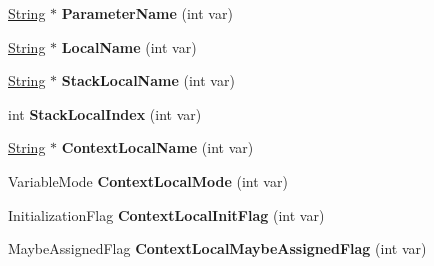 \begin{DoxyCompactItemize}
\item 
\hyperlink{classv8_1_1internal_1_1_string}{String} $\ast$ {\bfseries Parameter\+Name} (int var)\hypertarget{classv8_1_1internal_1_1_scope_info_add97fe28aedcb5de286d0d79fd291aef}{}\label{classv8_1_1internal_1_1_scope_info_add97fe28aedcb5de286d0d79fd291aef}

\item 
\hyperlink{classv8_1_1internal_1_1_string}{String} $\ast$ {\bfseries Local\+Name} (int var)\hypertarget{classv8_1_1internal_1_1_scope_info_acdac107aacd45fbfed0068240e5616bc}{}\label{classv8_1_1internal_1_1_scope_info_acdac107aacd45fbfed0068240e5616bc}

\item 
\hyperlink{classv8_1_1internal_1_1_string}{String} $\ast$ {\bfseries Stack\+Local\+Name} (int var)\hypertarget{classv8_1_1internal_1_1_scope_info_af01df9ddb90605479c6c065e8df37287}{}\label{classv8_1_1internal_1_1_scope_info_af01df9ddb90605479c6c065e8df37287}

\item 
int {\bfseries Stack\+Local\+Index} (int var)\hypertarget{classv8_1_1internal_1_1_scope_info_a88941dda595181e23537eea761b308cf}{}\label{classv8_1_1internal_1_1_scope_info_a88941dda595181e23537eea761b308cf}

\item 
\hyperlink{classv8_1_1internal_1_1_string}{String} $\ast$ {\bfseries Context\+Local\+Name} (int var)\hypertarget{classv8_1_1internal_1_1_scope_info_acca4416c621b0b833e57bca1d5dff907}{}\label{classv8_1_1internal_1_1_scope_info_acca4416c621b0b833e57bca1d5dff907}

\item 
Variable\+Mode {\bfseries Context\+Local\+Mode} (int var)\hypertarget{classv8_1_1internal_1_1_scope_info_a591902882e5e0a03a3e4a47361ffe32f}{}\label{classv8_1_1internal_1_1_scope_info_a591902882e5e0a03a3e4a47361ffe32f}

\item 
Initialization\+Flag {\bfseries Context\+Local\+Init\+Flag} (int var)\hypertarget{classv8_1_1internal_1_1_scope_info_a03953d8010b3cfa19b38242fc1c089b2}{}\label{classv8_1_1internal_1_1_scope_info_a03953d8010b3cfa19b38242fc1c089b2}

\item 
Maybe\+Assigned\+Flag {\bfseries Context\+Local\+Maybe\+Assigned\+Flag} (int var)\hypertarget{classv8_1_1internal_1_1_scope_info_af8735ce84326b15e7bbd1c783104aba6}{}\label{classv8_1_1internal_1_1_scope_info_af8735ce84326b15e7bbd1c783104aba6}


\end{DoxyCompactItemize}
